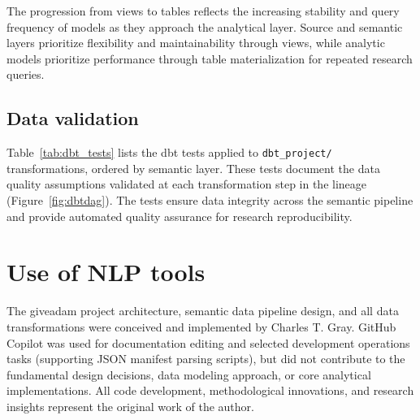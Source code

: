 \documentclass{article}
\begin{document}
The progression from views to tables reflects the increasing stability and query frequency of models as they approach the analytical layer. Source and semantic layers prioritize flexibility and maintainability through views, while analytic models prioritize performance through table materialization for repeated research queries.

\subsection{Data validation}

Table~\ref{tab:dbt_tests} lists the dbt tests applied to \texttt{dbt\_project/} transformations, ordered by semantic layer. These tests document the data quality assumptions validated at each transformation step in the lineage (Figure~\ref{fig:dbtdag}). The tests ensure data integrity across the semantic pipeline and provide automated quality assurance for research reproducibility.



\section{Use of NLP tools}

The giveadam project architecture, semantic data pipeline design, and all data transformations were conceived and implemented by Charles T. Gray. GitHub Copilot \cite{copilot} was used for documentation editing and selected development operations tasks (supporting JSON manifest parsing scripts), but did not contribute to the fundamental design decisions, data modeling approach, or core analytical implementations. All code development, methodological innovations, and research insights represent the original work of the author.



\end{document}
